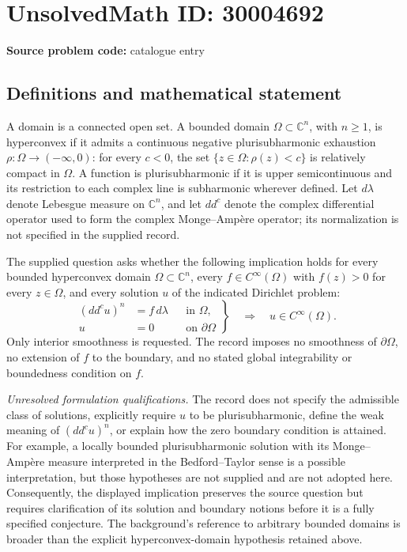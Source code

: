 \documentclass[11pt]{article}
\newcommand{\C}{\mathbb{C}}
\begin{document}
\section*{UnsolvedMath ID: 30004692}
\textbf{Source problem code:} catalogue entry
\subsection{Definitions and mathematical statement}
A domain is a connected open set. A bounded domain \(\Omega\subset\C^n\), with \(n\geq 1\), is hyperconvex if it admits a continuous negative plurisubharmonic exhaustion \(\rho\colon\Omega\to(-\infty,0)\): for every \(c<0\), the set \(\{z\in\Omega:\rho(z)<c\}\) is relatively compact in \(\Omega\). A function is plurisubharmonic if it is upper semicontinuous and its restriction to each complex line is subharmonic wherever defined. Let \(d\lambda\) denote Lebesgue measure on \(\C^n\), and let \(dd^c\) denote the complex differential operator used to form the complex Monge--Amp\`ere operator; its normalization is not specified in the supplied record.

The supplied question asks whether the following implication holds for every bounded hyperconvex domain \(\Omega\subset\C^n\), every \(f\in C^\infty(\Omega)\) with \(f(z)>0\) for every \(z\in\Omega\), and every solution \(u\) of the indicated Dirichlet problem:
\[
\left.
\begin{aligned}
(dd^c u)^n&=f\,d\lambda &&\text{in }\Omega,\\
u&=0 &&\text{on }\partial\Omega
\end{aligned}
\right\}
\quad\Longrightarrow\quad u\in C^\infty(\Omega).
\]
Only interior smoothness is requested. The record imposes no smoothness of \(\partial\Omega\), no extension of \(f\) to the boundary, and no stated global integrability or boundedness condition on \(f\).

\emph{Unresolved formulation qualifications.} The record does not specify the admissible class of solutions, explicitly require \(u\) to be plurisubharmonic, define the weak meaning of \((dd^c u)^n\), or explain how the zero boundary condition is attained. For example, a locally bounded plurisubharmonic solution with its Monge--Amp\`ere measure interpreted in the Bedford--Taylor sense is a possible interpretation, but those hypotheses are not supplied and are not adopted here. Consequently, the displayed implication preserves the source question but requires clarification of its solution and boundary notions before it is a fully specified conjecture. The background's reference to arbitrary bounded domains is broader than the explicit hyperconvex-domain hypothesis retained above.
\end{document}
